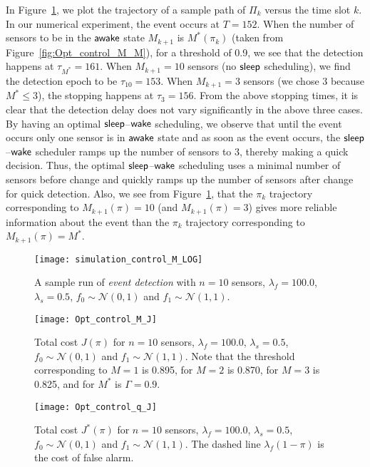 \documentclass[journal]{IEEEtran}
\newcommand{\sleep}{{${\sf sleep }$}}
\newcommand{\wake}{{${\sf awake }$}}
\begin{document}
\begin{itemize}
In Figure~\ref{fig:simulation_control_M}, we plot the trajectory of a
sample path of $\Pi_k$ versus the time slot $k$. In our numerical
experiment, the event occurs at $T = 152$. When the number of sensors to
be in the {\wake} state $M_{k+1}$ is $M^*(\pi_k)$ (taken from 
Figure~\ref{fig:Opt_control_M_M}), for a threshold of 0.9, we see that 
the detection happens at $\tau_{M^*} = 161$. When $M_{k+1} = 10$ 
sensors (no {\sleep} scheduling), we find the detection epoch to be 
$\tau_{10} = 153$. When $M_{k+1} = 3$ sensors (we chose 3 because $M^* 
\le 3$), the stopping happens at $\tau_3 = 156$. From the above stopping
times, it is clear that the detection delay does not vary significantly
in the above three cases. By having an optimal {\sleep}--{$\sf wake$}
scheduling, we observe that until the event occurs only one sensor is in
{\wake} state and as soon as the event occurs, the {\sleep}--{$\sf wake$}
scheduler ramps up the number of sensors to 3, thereby making a quick
decision. Thus, the optimal {\sleep}--{$\sf wake$} scheduling uses a
minimal number of sensors before change and quickly ramps up the number
of sensors after change for quick detection.
Also, we see from
Figure~\ref{fig:simulation_control_M}, that the $\pi_k$ trajectory
corresponding to $M_{k+1}(\pi) =  10$ (and $M_{k+1}(\pi) =  3$) gives
more reliable information about the event than the $\pi_k$ trajectory
corresponding to $M_{k+1}(\pi) =  M^*$.    
\begin{figure}
\centering
\texttt{[image: simulation\_control\_M\_LOG]}
\caption{A sample run of {\em event detection} with $n = 10$ sensors, 
$\lambda_f = 100.0$, $\lambda_s = 0.5$, $f_0 \sim \mathcal{N}(0,1)$ 
and $f_1 \sim \mathcal{N}(1,1)$.}
\label{fig:simulation_control_M}
\end{figure}
\begin{figure}
\centering
\texttt{[image: Opt\_control\_M\_J]}
\caption{Total cost $J(\pi)$ for $n = 10$ sensors, $\lambda_f = 100.0$, $\lambda_s = 0.5$, $f_0 \sim \mathcal{N}(0,1)$ and $f_1 \sim \mathcal{N}(1,1)$. Note that the threshold 
corresponding to $M = 1$ is 0.895, for $M = 2$ is 0.870, 
for $M = 3$ is 0.825, and for $M^*$ is $\Gamma = 0.9$.}
\label{fig:Opt_control_M_J}
\end{figure}

\begin{figure}[t]
\centering
\texttt{[image: Opt\_control\_q\_J]}
\caption{Total cost $J^*(\pi)$ for $n = 10$ sensors, $\lambda_f = 100.0$,
$\lambda_s = 0.5$, $f_0 \sim \mathcal{N}(0,1)$ and $f_1 \sim
\mathcal{N}(1,1)$. The dashed line $\lambda_f(1-\pi)$ is the cost of
false alarm.}
\label{fig:Opt_control_q_J}
\end{figure}


\end{itemize}
\end{document}
